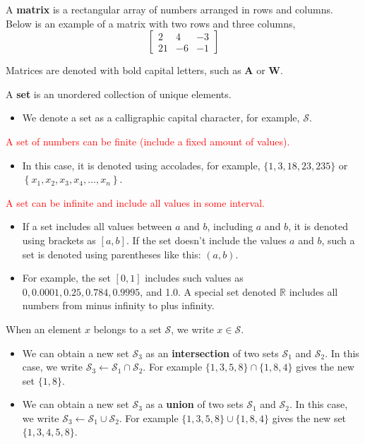 \documentclass[9pt,dvipsnames]{beamer}
\begin{document}
\begin{frame}
	A \textbf{matrix} is a rectangular array of numbers arranged in rows and columns. Below is an example of a matrix with two rows and three columns,
	$$
		\left[\begin{array}{ccc}
				2  & 4  & -3 \\
				21 & -6 & -1
			\end{array}\right]
	$$

	Matrices are denoted with bold capital letters, such as \(\mathbf{A}\) or \(\mathbf{W}\).

	A \textbf{set} is an unordered collection of unique elements.
	\begin{itemize}
		\item We denote a set as a calligraphic capital character, for example, $\mathcal{S}$.
	\end{itemize}
	\textcolor{red}{A set of numbers can be finite (include a fixed amount of values).}
	\begin{itemize}
		\item  In this case, it is denoted using accolades, for example, $\{1,3,18,23,235\}$ or $\left\{x_{1}, x_{2}, x_{3}, x_{4}, \ldots, x_{n}\right\}$.
	\end{itemize}

	\textcolor{red}{A set can be infinite and include all values in some interval.}
	\begin{itemize}
		\item If a set includes all values between $a$ and $b$, including $a$ and $b$, it is denoted using brackets as $[a, b]$. If the set doesn't include the values $a$ and $b$, such a set is denoted using parentheses like this: $(a, b)$.
	\end{itemize}

	\begin{itemize}
		\item For example, the set $[0,1]$ includes such values as $0,0.0001,0.25,0.784,0.9995$, and 1.0. A special set denoted $\mathbb{R}$ includes all numbers from minus infinity to plus infinity.
	\end{itemize}

\end{frame}

\begin{frame}
	When an element $x$ belongs to a set $\mathcal{S}$, we write $x \in \mathcal{S}$.
	\begin{itemize}
		\item 	We can obtain a new set $\mathcal{S}_{3}$ as an \textbf{intersection} of two sets $\mathcal{S}_{1}$ and $\mathcal{S}_{2}$. In this case, we write $\mathcal{S}_{3} \leftarrow \mathcal{S}_{1} \cap \mathcal{S}_{2}$. For example $\{1,3,5,8\} \cap\{1,8,4\}$ gives the new set $\{1,8\}$.
		\item 	We can obtain a new set $\mathcal{S}_{3}$ as a \textbf{union} of two sets $\mathcal{S}_{1}$ and $\mathcal{S}_{2}$. In this case, we write $\mathcal{S}_{3} \leftarrow \mathcal{S}_{1} \cup \mathcal{S}_{2}$. For example $\{1,3,5,8\} \cup\{1,8,4\}$ gives the new set $\{1,3,4,5,8\}$.
	\end{itemize}
\end{frame}
\end{document}
